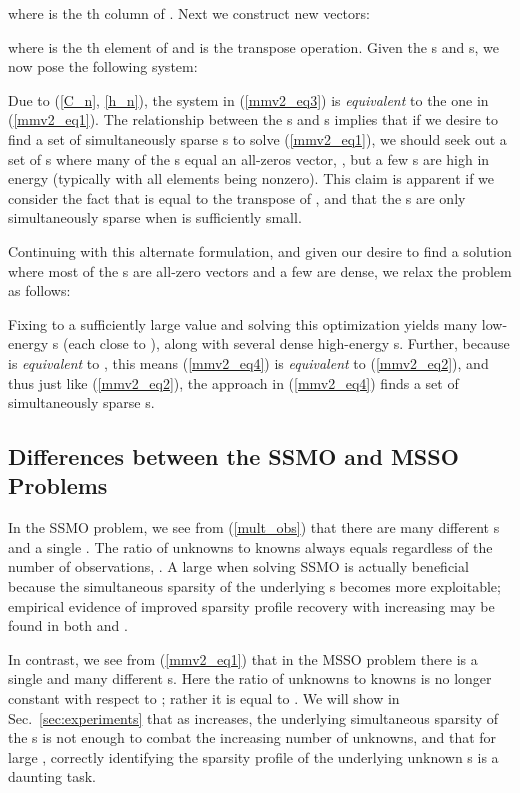 \documentclass[final]{siamltex}
\newcommand{\la}[1]{\mbox{}}  \newcommand{\sst}[1]{\mbox{\scriptsize{#1}}}
\begin{document}
   where  is the th column of .
   Next we construct  new vectors:
   
   where  is the th element of  and
    is the transpose operation.
   Given the s and s, we now pose the
   following system:
   
   Due to (\ref{C_n}, \ref{h_n}), the system in (\ref{mmv2_eq3}) is 
   {\em{equivalent}} to the one in (\ref{mmv2_eq1}).  The relationship
   between the s and s implies that if we desire
   to find a set of simultaneously sparse s to solve
   (\ref{mmv2_eq1}), we should seek out a set of s where
   many of the s equal an all-zeros vector, \la{0}, but a
   few s are high in  energy (typically with all
   elements being nonzero).  This claim is apparent if we consider the
   fact that  is equal to the
   transpose of , and that the s are only 
   simultaneously sparse when  is sufficiently small.

   Continuing with this alternate formulation, and given our desire
   to find a solution where most of the s are all-zero
   vectors and a few are dense, we relax the problem as follows:
   
   Fixing  to a sufficiently large value and solving this
   optimization yields many low-energy s (each close to
   \la{0}), along with several dense high-energy s.
   Further, because  is
   {\em{equivalent}} to ,
   this means (\ref{mmv2_eq4}) is {\em{equivalent}} to
   (\ref{mmv2_eq2}), and thus just like (\ref{mmv2_eq2}), the approach
   in (\ref{mmv2_eq4}) finds a set of simultaneously sparse
   s.

\subsection{Differences between the SSMO and MSSO Problems}

   In the SSMO problem, we see from (\ref{mult_obs}) that there are
   many different \la{d}s and a single \la{F}.  The ratio of unknowns
   to knowns always equals  regardless of the number of
   observations, .  A large  when solving SSMO is actually
   beneficial because the simultaneous sparsity of the underlying
   s becomes more exploitable; empirical evidence of
   improved sparsity profile recovery with increasing  may be found
   in both \cite{Cot2005} and \cite{Mal2005}.

   In contrast, we see from (\ref{mmv2_eq1}) that in the MSSO problem
   there is a single \la{d} and many different \la{F}s.  Here the
   ratio of unknowns to knowns is no longer constant with respect to
   ; rather it is equal to .  We will show in
   Sec.~\ref{sec:experiments} that as  increases, the underlying
   simultaneous sparsity of the s is not enough to combat
   the increasing number of unknowns, and that for large ,
   correctly identifying the sparsity profile of the underlying
   unknown s is a daunting task.
   
\end{document}
